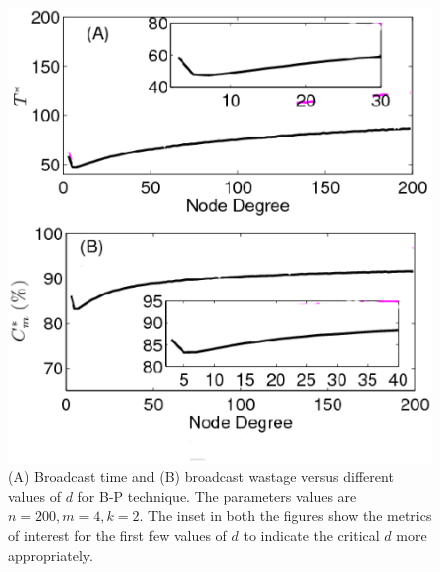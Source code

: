 \begin{figure}
\centering
\includegraphics[scale=0.35]{./texfiles/Chapter_3/netsci/figs1/DiffTopology_varyN200_varyD_push_pullRes_m4_k21.eps}
\caption{(A) Broadcast time and (B) broadcast wastage versus different values of $d$ for B-P technique. The parameters values are $n=200, m=4, k=2$. The inset in both the figures show the metrics of interest for the first few values of $d$ to indicate the critical $d$ more appropriately.}
\label{DiffTopologyGraph_N200_varyD_push_pull}
\end{figure}



